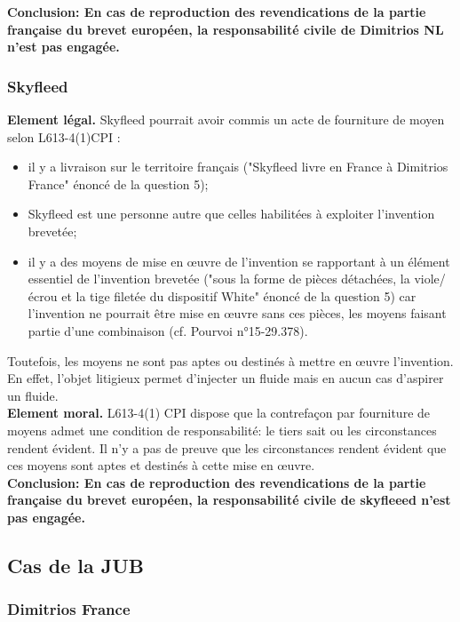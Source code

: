 \textbf{Conclusion: En cas de reproduction des revendications de la partie française du brevet européen,
la responsabilité civile de Dimitrios NL n'est pas engagée.}

\subsubsection{Skyfleed}

\textbf{Element légal.} Skyfleed pourrait avoir commis un acte de fourniture de moyen selon L613-4(1)CPI :
\begin{itemize}
    \item il y a livraison sur le territoire français ("Skyfleed livre en France
    à Dimitrios France" énoncé de la question 5);
    \item Skyfleed est une personne autre que celles habilitées à exploiter
    l'invention brevetée;
    \item il y a des moyens de mise en œuvre de l'invention se rapportant à un 
    élément essentiel de l'invention brevetée ("sous la forme
    de pièces détachées, la viole/écrou et la tige filetée du dispositif White"
    énoncé de la question 5) car l'invention ne pourrait être mise en œuvre
    sans ces pièces, les moyens faisant partie d'une combinaison (cf. Pourvoi
    n°15-29.378).\\
\end{itemize}

Toutefois, les moyens ne sont pas aptes ou destinés à mettre en œuvre l'invention.
En effet, l'objet litigieux permet d'injecter un fluide mais en aucun cas d'aspirer
un fluide.\\

\textbf{Element moral.} L613-4(1) CPI dispose que la contrefaçon par fourniture de moyens
admet une condition de responsabilité: le tiers sait ou les circonstances rendent
évident. Il n'y a pas de preuve que les circonstances rendent évident que ces moyens sont aptes et destinés 
à cette mise en œuvre.\\

\textbf{Conclusion: En cas de reproduction des revendications de la partie française du brevet européen,
la responsabilité civile de skyfleeed n'est pas engagée.}

\subsection{Cas de la JUB}

\subsubsection{Dimitrios France}


